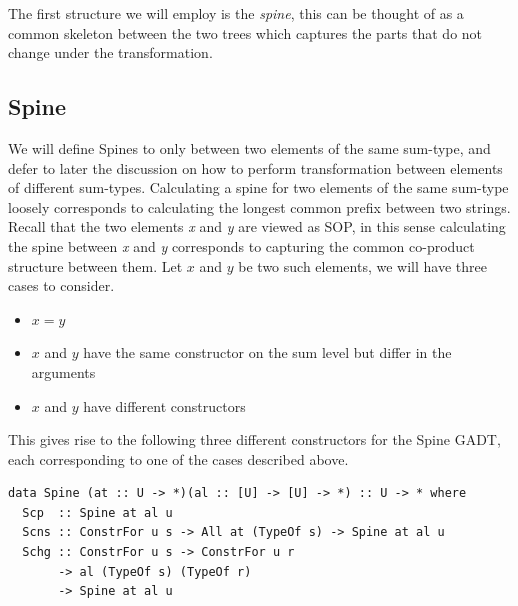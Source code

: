 \documentclass[11pt, titlepage]{article}
\begin{document}
The first structure we will employ is the \emph{spine}, this can be thought of as a common skeleton between 
the two trees which captures the parts that do not change under the transformation.

\subsection{Spine}\label{spine}

We will define Spines to only between two elements of the same sum-type, and defer to later the discussion on how
to perform transformation between elements of different sum-types. Calculating a spine for two elements of the same sum-type 
loosely corresponds to calculating the longest common prefix between two strings. Recall that the two 
elements \emph{x} and \emph{y} are viewed as SOP, in this sense calculating the
spine between \emph{x} and \emph{y} corresponds to capturing the common
co-product structure between them. Let $x$ and $y$ be two such elements, we will have three cases to
consider. 
\begin{itemize}
  \item $x = y$
  \item $x$ and $y$ have the same constructor on the sum level but differ in the 
  arguments
  \item $x$ and $y$ have different constructors
\end{itemize}

This gives rise
to the following three different constructors for the Spine GADT, each
corresponding to one of the cases described above.

\begin{verbatim}
data Spine (at :: U -> *)(al :: [U] -> [U] -> *) :: U -> * where
  Scp  :: Spine at al u
  Scns :: ConstrFor u s -> All at (TypeOf s) -> Spine at al u
  Schg :: ConstrFor u s -> ConstrFor u r
       -> al (TypeOf s) (TypeOf r)
       -> Spine at al u
\end{verbatim}
\end{document}

